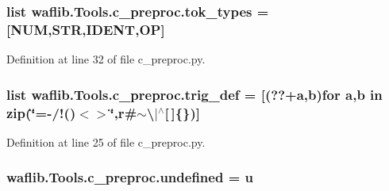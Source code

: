\subsubsection[{\texorpdfstring{tok\+\_\+types}{tok_types}}]{\setlength{\rightskip}{0pt plus 5cm}list waflib.\+Tools.\+c\+\_\+preproc.\+tok\+\_\+types = \mbox{[}{\bf N\+UM},{\bf S\+TR},{\bf I\+D\+E\+NT},{\bf OP}\mbox{]}}\hypertarget{namespacewaflib_1_1_tools_1_1c__preproc_afab91257fd2c3bf3e8e26cf1c18edfea}{}\label{namespacewaflib_1_1_tools_1_1c__preproc_afab91257fd2c3bf3e8e26cf1c18edfea}


Definition at line 32 of file c\+\_\+preproc.\+py.

\subsubsection[{\texorpdfstring{trig\+\_\+def}{trig_def}}]{\setlength{\rightskip}{0pt plus 5cm}list waflib.\+Tools.\+c\+\_\+preproc.\+trig\+\_\+def = \mbox{[}(\textquotesingle{}??\textquotesingle{}+{\bf a},{\bf b}){\bf for} {\bf a},{\bf b} {\bf in} zip(\char`\"{}=-\//!\textquotesingle{}()$<$$>$\char`\"{},r\textquotesingle{}\#$\sim$\textbackslash{}$\vert$$^\wedge$\mbox{[}$\,$\mbox{]}\{\}\textquotesingle{})\mbox{]}}\hypertarget{namespacewaflib_1_1_tools_1_1c__preproc_a1977ad5d8cca34cfd75853b49ac25597}{}\label{namespacewaflib_1_1_tools_1_1c__preproc_a1977ad5d8cca34cfd75853b49ac25597}


Definition at line 25 of file c\+\_\+preproc.\+py.

\subsubsection[{\texorpdfstring{undefined}{undefined}}]{ waflib.\+Tools.\+c\+\_\+preproc.\+undefined = \textquotesingle{}u\textquotesingle{}}\hypertarget{namespacewaflib_1_1_tools_1_1c__preproc_af21b3de339112b5277246d68b1378e7b}{}\label{namespacewaflib_1_1_tools_1_1c__preproc_af21b3de339112b5277246d68b1378e7b}


